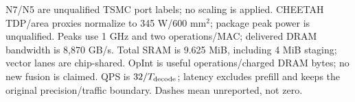\begin{table}[H]
\begin{tabular*}{\linewidth}{@{\extracolsep{\fill}}lrrr@{}}
\bottomrule
\end{tabular*}
\endgroup
\par\vspace{3pt}
\parbox{\linewidth}{\scriptsize
N7/N5 are unqualified TSMC port labels; no scaling is applied. CHEETAH TDP/area
proxies normalize to 345 W/600 mm$^2$; package peak power is unqualified.
Peaks use 1 GHz and two operations/MAC; delivered DRAM bandwidth is 8,870 GB/s.
Total SRAM is 9.625 MiB, including 4 MiB staging; vector lanes are chip-shared.
OpInt is useful operations/charged DRAM bytes; no new fusion is claimed.
QPS is $32/T_{\rm decode}$; latency excludes prefill and keeps the original
precision/traffic boundary. Dashes mean unreported, not zero.}
\end{table}
\endgroup
